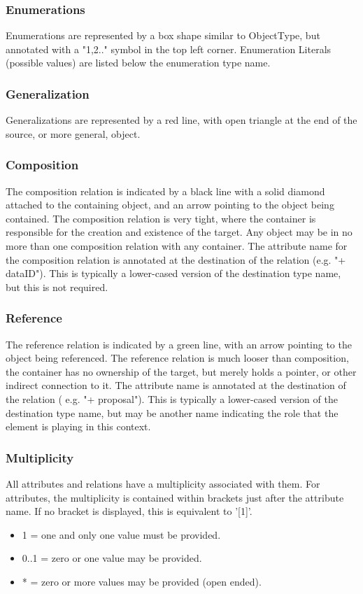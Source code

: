   \subsubsection{Enumerations}
  \label{sect:Enumerations}
  Enumerations are represented by a box shape similar to ObjectType, but annotated with a "1,2.."
symbol in the top left corner. Enumeration Literals (possible values) are listed below the
enumeration type name.

  \subsubsection{Generalization}
  \label{sect:Generalization}
  Generalizations are represented by a red line, with open triangle at the end of the source, or more general, object.

  \subsubsection{Composition}
  \label{sect:Composition}
  The composition relation is indicated by a black line with a solid diamond attached to the
containing object, and an arrow pointing to the object being contained. The composition relation is
very tight, where the container is responsible for the creation and existence of the target. Any
object may be in no more than one composition relation with any container. The attribute name
for the composition relation is annotated at the destination of the relation (e.g. "+ dataID"). This is
typically a lower-cased version of the destination type name, but this is not required.

  \subsubsection{Reference}
  \label{sect:Reference}
  The reference relation is indicated by a green line, with an arrow pointing to the object being
referenced. The reference relation is much looser than composition, the container has no
ownership of the target, but merely holds a pointer, or other indirect connection to it. The
attribute name is annotated at the destination of the relation ( e.g. "+ proposal"). This is typically
a lower-cased version of the destination type name, but may be another name indicating the role
that the element is playing in this context.

  \subsubsection{Multiplicity}
  \label{sect:Multiplicity}
  All attributes and relations have a multiplicity associated with them. For attributes, the multiplicity
is contained within brackets just after the attribute name. If no bracket is displayed, this is
equivalent to '[1]'.
\begin{itemize}
\item 1 = one and only one value must be provided.
\item 0..1 = zero or one value may be provided.
\item * = zero or more values may be provided (open ended).
\end{itemize}


